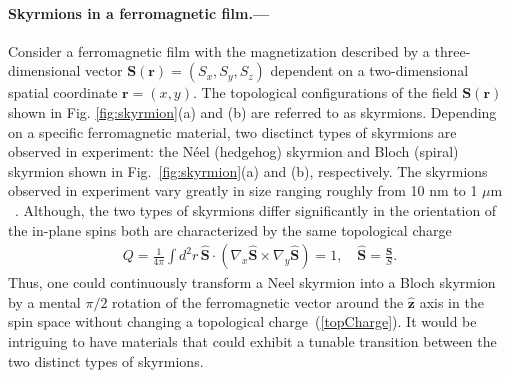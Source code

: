 \documentclass[twocolumn,showpacs,floatfix,longbibliography]{revtex4-1}
\begin{document}
\paragraph*{Skyrmions in a ferromagnetic film.---} \label{sec:skyrmion}


Consider a ferromagnetic film with the magnetization described by a three-dimensional vector $\bm S(\bm r) = (S_x,S_y,S_z)$ dependent on a two-dimensional spatial coordinate $\bm r = (x,y)$. The topological configurations of the field $\bm S(\bm r)$ shown in Fig. \ref{fig:skyrmion}(a) and (b) are referred to as skyrmions.  Depending on a specific ferromagnetic material, two disctinct types of skyrmions are observed in experiment: the N\'eel (hedgehog) skyrmion and Bloch (spiral) skyrmion shown in Fig.~\ref{fig:skyrmion}(a) and (b), respectively.  The skyrmions observed in experiment vary greatly in size ranging roughly from 10 nm to 1 $\mu$m ~\cite{Muhlbauer2009,Munzer2010,Yu2011,Heinze2011,Seki2012,Heinze2011,Romming2013,Bergmann2014,Brede2014,Sonntag2014,vonBergmann2015,Romming2015}. Although, the two types of skyrmions differ significantly in the orientation of the in-plane spins both are characterized by the same topological charge
\begin{align}
	Q = \frac{1}{4\pi} \int d^2r \, \hat {\bm S}\cdot (\nabla_x\hat {\bm S}\times\nabla_y\hat {\bm S})=1,\quad  \hat {\bm S}= \frac{\bm S}{S}. 
	\label{topCharge}
\end{align}
Thus, one could continuously transform a Neel skyrmion into a Bloch skyrmion by a mental $\pi/2$ rotation of the ferromagnetic vector around the $\hat {\bm z}$ axis in the spin space without changing a topological charge~(\ref{topCharge}). It would be intriguing to have materials that could exhibit a tunable transition between the two distinct types of skyrmions. 


\end{document}
